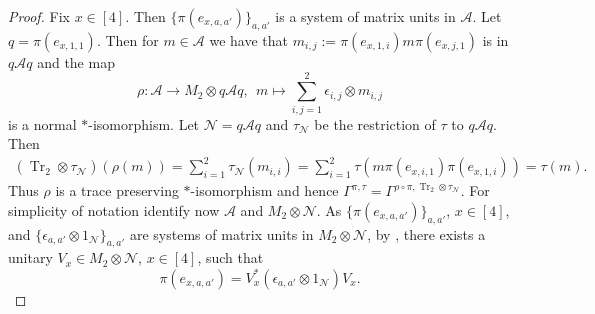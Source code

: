 \documentclass[11pt]{amsart}
\theoremstyle{definition}
\newcommand{\cl}[1]{\mathcal{#1}}
\DeclareMathOperator{\Tr}{Tr}
\begin{document}
\begin{proof}
Fix $x\in [4]$. Then $\{\pi(e_{x,a,a'})\}_{a,a'}$ is a system of matrix units in $\cl A$. Let $q=\pi(e_{x,1,1})$. Then for $m\in\cl A$ we have that
$m_{i,j}:=\pi(e_{x,1,i})m\pi(e_{x,j,1})$ is in $q\cl A q$ and the map
$$\rho:\cl A\to M_2\otimes q\cl A q, \ \ m\mapsto\sum_{i,j=1}^2\epsilon_{i,j}\otimes m_{i,j}$$
is a normal $*$-isomorphism.  Let $\cl N=q\cl A q$ and $\tau_{\cl N}$ be the restriction of $\tau$ to $q\cl A q$.
Then 
\begin{eqnarray*}
    (\Tr_2\otimes\tau_{\cl N})(\rho(m))=\sum_{i=1}^2\tau_{\cl N}(m_{i,i})=\sum_{i=1}^2\tau(m\pi(e_{x,i,1})\pi(e_{x,1,i}))=\tau(m).
\end{eqnarray*}
Thus $\rho$ is a trace preserving $*$-isomorphism and hence $\Gamma^{\pi,\tau}=\Gamma^{\rho\circ\pi,\Tr_2\otimes\tau_{\cl N}}$. For simplicity of notation identify now $\cl A$ and $M_2\otimes\cl N$. 
As $\{\pi(e_{x,a,a'})\}_{a,a'}$, $x\in [4]$, and $\{\epsilon_{a,a'}\otimes 1_{\cl N}\}_{a,a'}$ are systems of matrix units in $M_2\otimes\cl N$, by \cite[Lemma 2.1]{haagerup-musat}, there exists a unitary $V_x\in M_2\otimes\cl N$, $x\in [4]$, such that $$\pi(e_{x,a,a'})=V_x^*(\epsilon_{a,a'}\otimes 1_{\cl N})V_x.$$



\end{proof}
\end{document}

